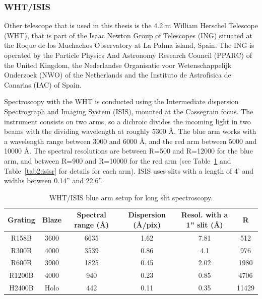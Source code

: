 \subsubsection{WHT/ISIS}
\label{sec2:isis}

Other telescope that is used in this thesis is the 4.2 m William Herschel Telescope (WHT), that is part of the Isaac Newton Group of Telescopes (ING) situated at the Roque de los Muchachos Observatory at La Palma island, Spain. The ING is operated by the Particle Physics And Astronomy Research Council (PPARC) of the United Kingdom, the Nederlandse Organisatie voor Wetenschappelijk Onderzoek (NWO) of the Netherlands and the Instituto de Astrofísica de Canarias (IAC) of Spain.

Spectroscopy with the WHT is conducted using the Intermediate dispersion Spectrograph and Imaging System (ISIS), mounted at the Cassegrain focus. The instrument consists on two arms, so a dichroic divides the incoming light in two beams with the dividing wavelength at roughly 5300 \AA. The blue arm works with a wavelength range between 3000 and 6000 \AA, and the red arm between 5000 and 10000 \AA. The spectral resolutions are between R=500 and R=12000 for the blue arm, and between R=900 and R=10000 for the red arm (see Table~\ref{tab2:isisb} and Table~\ref{tab2:isisr} for details for each arm). ISIS uses slits with a length of 4' and widths between 0.14'' and 22.6''.


\begin{table}
\begin{center}
\caption{WHT/ISIS blue arm setup for long slit spectroscopy.}
\begin{tabular}{|c|c|c|c|c|c|}
\hline
Grating & Blaze & Spectral range (\AA) & Dispersion (\AA/pix) & Resol. with a 1'' slit (\AA) & R \\ \hline
R158B	 & 3600 & 6635 & 1.62 & 7.81  & 512 \\ \hline
R300B	 & 4000 & 3539 & 0.86 & 4.1  & 976 \\ \hline
R600B	 & 3900 & 1825 & 0.45 & 2.02 & 1980  \\ \hline
R1200B & 4000 & 940 & 0.23 & 0.85 & 4706 \\ \hline
H2400B & Holo  & 442 & 0.11 & 0.35 & 11429  \\ 
\hline
\end{tabular}
\label{tab2:isisb}
\end{center}
\end{table}


